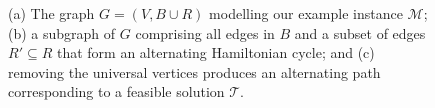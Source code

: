 \documentclass[a4paper,11pt,authoryear]{elsarticle}
\begin{document}


\begin{figure}[h!]	
	\centering
	\begin{subfigure}[b]{0.4\textwidth}
		
		\caption{}
		\label{fig:threshold2}
	\end{subfigure} \hspace{5mm}
	\begin{subfigure}[b]{0.4\textwidth}
		
		\caption{}
		\label{fig:althamcycleordered}
	\end{subfigure}
	\begin{subfigure}[b]{0.75\textwidth}
		
		\caption{}
		\label{fig:solutionpathsimple}
	\end{subfigure}
	\caption{(a) The graph $G=(V, B \cup R)$ modelling our example instance $\mathcal{M}$; (b) a subgraph of $G$ comprising all edges in $B$ and a subset of edges $R'\subseteq R$ that form an alternating Hamiltonian cycle; and (c) removing the universal vertices produces an alternating path corresponding to a feasible solution $\mathcal{T}$.}
	\label{fig:althamsoln}
\end{figure}
\end{document}
